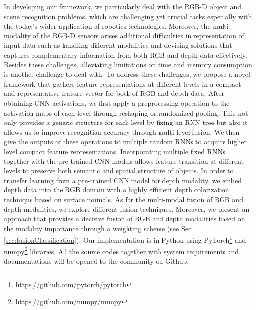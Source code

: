 \documentclass[10pt,journal,compsoc]{IEEEtran}
\begin{document}
In developing our framework, we particularly deal with the RGB-D object and scene recognition problems, which are challenging yet crucial tasks especially with the today’s wider application of robotics technologies. Moreover, the multi-modality of the RGB-D sensors arises additional difficulties in representation of input data such as handling different modalities and devising solutions that captures complementary information from both RGB and depth data effectively. Besides these challenges, alleviating limitations on time and memory consumption is another challenge to deal with. To address these challenges, we propose a novel framework that gathers feature representations at different levels in a compact and representative feature vector for both of RGB and depth data. After obtaining CNN activations, we first apply a preprocessing operation to the activation maps of each level through reshaping or randomized pooling. This not only provides a generic structure for each level by fixing an RNN tree but also it allows us to improve recognition accuracy through multi-level fusion. We then give the outputs of these operations to multiple random RNNs \cite{Socher_NIPS_2012} to acquire higher level compact feature representations. Incorporating multiple fixed RNNs together with the pre-trained CNN models allows feature transition at different levels to preserve both semantic and spatial structure of objects. In order to transfer learning from a pre-trained CNN model for depth modality, we embed depth data into the RGB domain with a highly efficient depth colorization technique based on surface normals. As for the multi-modal fusion of RGB and depth modalities, we explore different fusion techniques. Moreover, we present an approach that provides a decisive fusion of RGB and depth modalities based on the modality importance through a weighting scheme (see Sec. \ref{sec:fusionClassification}).  Our implementation is in Python using PyTorch\footnote{\url{https://github.com/pytorch/pytorch}} and numpy\footnote{\url{https://github.com/numpy/numpy}} libraries. All the source codes together with system requirements and documentations will be opened to the community on Github.
\end{document}
